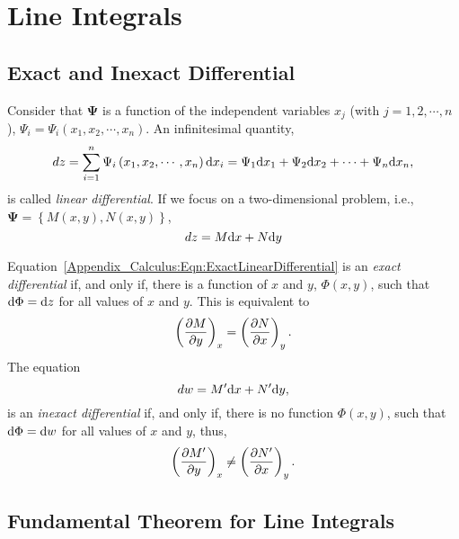 \section{Line Integrals}

\subsection{Exact and Inexact Differential}
Consider that $\mathbf{\Psi}$ is a function of the independent variables $x_{j}$ (with $j=1,2,\cdots,n$),  $\Psi_{i}=\Psi_{i}\left(x_{1},x_{2},\cdots,x_{n}\right)$. An infinitesimal quantity,
   \begin{displaymath}
      dz = \sum\limits_{i=1}^{n} \Psi_{i}\left(x_{1},x_{2},\cdots,x_{n}\right)\d{x_{i}} =  \Psi_{1}\d{x_{1}} + \Psi_{2}\d{x_{2}} +\cdots + \Psi_{n}\d{x_{n}},
   \end{displaymath}
is called {\it linear differential}. If we focus on a two-dimensional problem, i.e., $\mathbf{\Psi}=\left\{M(x,y),N(x,y)\right\}$,
   \begin{equation}
      dz = M\d{x} + N\d{y}\label{Appendix_Calculus:Eqn:ExactLinearDifferential}
   \end{equation}

\medskip
Equation~\ref{Appendix_Calculus:Eqn:ExactLinearDifferential} is an {\it exact differential} if, and only if, there is a function of $x$ and $y$, $\Phi(x,y)$, such that $\d{\Phi}=\d{z}$ for all values of $x$ and $y$. This is equivalent to
   \begin{displaymath}
        \Partial[M]{y}{x} = \Partial[N]{x}{y}.
   \end{displaymath}
The equation
   \begin{equation}
      dw = M^{\prime}\d{x} + N^{\prime}\d{y},\label{Appendix_Calculus:Eqn:InexactLinearDifferential}
   \end{equation}
 is an {\it inexact differential} if, and only if, there is no function $\Phi(x,y)$, such that $\d{\Phi}=\d{w}$ for all values of $x$ and $y$, thus,
   \begin{displaymath}
        \Partial[M^{\prime}]{y}{x} \neq \Partial[N^{\prime}]{x}{y}.
   \end{displaymath}

\subsection{Fundamental Theorem for Line Integrals}

